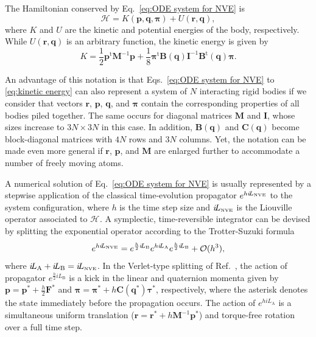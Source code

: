 \documentclass[
journal=jctcce,
layout=twocolumn
]{achemso}
\newcommand{\mt}[1]{\boldsymbol{\mathbf{#1}}}   %
\newcommand{\vt}[1]{\boldsymbol{\mathbf{#1}}}   %
\newcommand{\tr}[1]{#1^\text{t}}                %
\newcommand{\Ham}[1]{{\mathcal H}_\text{#1}}    %
\newcommand{\Liu}[1]{i\!L_\text{#1}}            %
\newcommand{\timestep}{h}
\begin{document}
The Hamiltonian conserved by Eq.~\eqref{eq:ODE system for NVE} is
\begin{equation}
\label{eq:Hamiltonian}
\Ham{} = K(\vt p, \vt q, \vt \pi) + U(\vt r,\vt q),
\end{equation}
where $K$ and $U$ are the kinetic and potential energies of the body, respectively. While $U(\vt r, \vt q)$ is an arbitrary function, the kinetic energy is given by
\begin{equation}
\label{eq:kinetic energy}
K = \frac{1}{2} \tr{\vt p} {\mt M}^{-1} {\vt p} + \frac{1}{8} \tr{\vt \pi} {\mt B}(\vt q) {\mt I}^{-1} \tr{\mt B}(\vt q) {\vt \pi}.
\end{equation}

An advantage of this notation is that Eqs.~\eqref{eq:ODE system for NVE} to \eqref{eq:kinetic energy} can also represent a system of $N$ interacting rigid bodies if we consider that vectors $\vt r$, $\vt p$, $\vt q$, and $\vt \pi$ contain the corresponding properties of all bodies piled together. The same occurs for diagonal matrices $\mt M$ and $\mt I$, whose sizes increase to $3N \times 3N$ in this case. In addition, $\mt B(\vt q)$ and $\mt C(\vt q)$ become block-diagonal matrices with $4N$ rows and $3N$ columns. Yet, the notation can be made even more general if $\vt r$, $\vt p$, and $\mt M$ are enlarged further to accommodate a number of freely moving atoms.

A numerical solution of Eq.~\eqref{eq:ODE system for NVE} is usually represented by a stepwise application of the classical time-evolution propagator \cite{Tuckerman_2010} $e^{\timestep \Liu{\tiny NVE}}$ to the system configuration, where $\timestep$ is the time step size and $\Liu{\tiny NVE}$ is the Liouville operator associated to $\Ham{}$. A symplectic, time-reversible integrator can be devised by splitting the exponential operator according to the Trotter-Suzuki formula \cite{Trotter_1959, Suzuki_1976}
\begin{equation}
\label{eq:splitting NVE}
e^{\timestep \Liu{\tiny NVE}} = e^{\frac{\timestep}{2} \Liu{B}} e^{\timestep \Liu{A}} e^{\frac{\timestep}{2} \Liu{B}} + \mathcal{O}(\timestep^3),
\end{equation}
where $\Liu{A} + \Liu{B} = \Liu{\tiny NVE}$. In the Verlet-type splitting of Ref.~, the action of propagator $e^{\frac{\timestep}{2} \Liu{B}}$ is a kick in the linear and quaternion momenta given by ${\vt p} = {\vt p}^\ast + \frac{\timestep}{2} {\vt F}^\ast$ and ${\vt \pi} = {\vt \pi}^\ast + \timestep {\mt C}({\vt q^\ast}) {\vt \tau}^\ast$, respectively, where the asterisk denotes the state immediately before the propagation occurs. The action of $e^{\timestep \Liu{A}}$ is a simultaneous uniform translation (${\vt r} = {\vt r}^\ast + \timestep {\mt M}^{-1} {\vt p}^\ast$) and torque-free rotation over a full time step.
\end{document}
